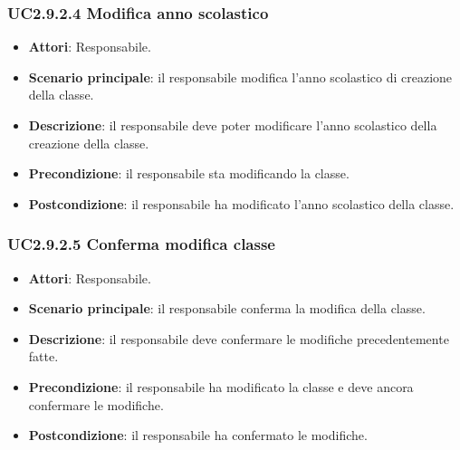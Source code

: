 \subsubsection{UC2.9.2.4 Modifica anno scolastico}
\begin{itemize}
\item \textbf{Attori}: Responsabile.
\item \textbf{Scenario principale}: il responsabile modifica l'anno scolastico di creazione della classe.
\item \textbf{Descrizione}: il responsabile deve poter modificare l'anno scolastico della creazione della classe.
\item \textbf{Precondizione}: il responsabile sta modificando la classe.
\item \textbf{Postcondizione}: il responsabile ha modificato l'anno scolastico della classe.
\end{itemize}
\subsubsection{UC2.9.2.5 Conferma modifica classe}
\begin{itemize}
\item \textbf{Attori}: Responsabile.
\item \textbf{Scenario principale}: il responsabile conferma la modifica della classe.
\item \textbf{Descrizione}: il responsabile deve confermare le modifiche precedentemente fatte.
\item \textbf{Precondizione}: il responsabile ha modificato la classe e deve ancora confermare le modifiche.
\item \textbf{Postcondizione}: il responsabile ha confermato le modifiche.
\end{itemize}

